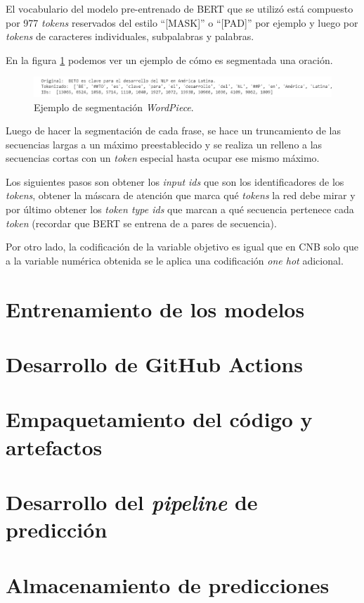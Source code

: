 El vocabulario del modelo pre-entrenado de BERT que se utilizó está compuesto por 977 \textit{tokens} reservados del estilo ``[MASK]'' o ``[PAD]'' por ejemplo y luego por \textit{tokens} de caracteres individuales, subpalabras y palabras. \citep{WEBSITE:22}

En la figura \ref{fig:segmentacion-bert} podemos ver un ejemplo de cómo es segmentada una oración.

\begin{figure}[htbp]
	\centering
	\includegraphics[width=1\textwidth]{./Figures/cap3-segmentacion.png}
	\caption{Ejemplo de segmentación \textit{WordPiece}\protect\footnotemark.}
	\label{fig:segmentacion-bert}
\end{figure}


Luego de hacer la segmentación de cada frase, se hace un truncamiento de las secuencias largas a un máximo preestablecido y se realiza un relleno a las secuencias cortas con un \textit{token} especial hasta ocupar ese mismo máximo.

Los siguientes pasos son obtener los \textit{input ids} que son los identificadores de los \textit{tokens}, obtener la máscara de atención que marca qué \textit{tokens} la red debe mirar y por último obtener los \textit{token type ids} que marcan a qué secuencia pertenece cada \textit{token} (recordar que BERT se entrena de a pares de secuencia).

Por otro lado, la codificación de la variable objetivo es igual que en CNB solo que a la variable numérica obtenida se le aplica una codificación \textit{one hot} adicional.

\section{Entrenamiento de los modelos}



\section{Desarrollo de GitHub Actions}



\section{Empaquetamiento del código y artefactos}



\section{Desarrollo del \textit{pipeline} de predicción}



\section{Almacenamiento de predicciones}


